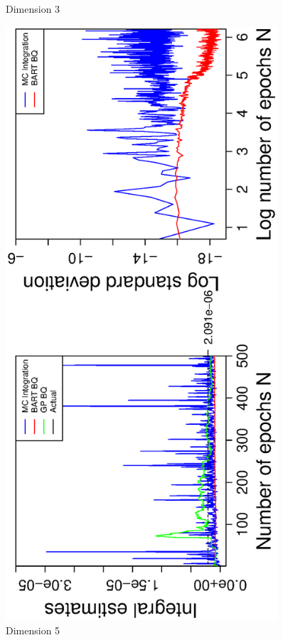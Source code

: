 \begin{figure}[H]
\begin{minipage}[b]{0.4\textwidth}
     \caption{Dimension 3}
  \end{minipage}
    \hspace{1.5cm}
  \begin{minipage}[b]{0.4\textwidth}
    \includegraphics[width= 0.9\textwidth, angle = -90]{report/Figures/2/convergenceMean25Dimensions.eps}
    \vspace{-1cm}
    \caption{Dimension 5}
  \end{minipage}
\end{figure}
\vspace{-1cm}

